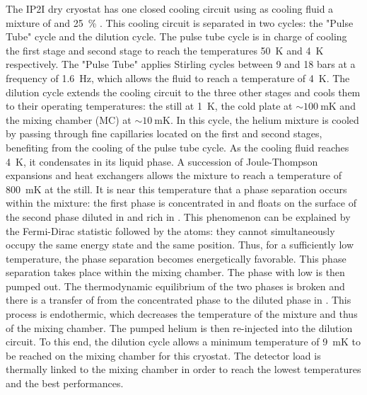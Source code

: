 The IP2I dry cryostat has one closed cooling circuit using as cooling fluid a mixture of  and \SI{25}{\percent} . This cooling circuit is separated in two cycles: the "Pulse Tube" cycle and the dilution cycle. 
The pulse tube cycle is in charge of cooling the first stage and second stage to reach the temperatures \SI{50}{\kelvin} and \SI{4}{\kelvin} respectively. The "Pulse Tube" applies Stirling cycles between 9 and 18 bars at a frequency of \SI{1.6}{\Hz}, which allows the  fluid to reach a temperature of \SI{4}{\kelvin}.
The dilution cycle extends the cooling circuit to the three other stages and cools them to their operating temperatures: the still at \SI{1}{\kelvin}, the cold plate at $\sim \SI{100}{\milli\kelvin}$ and the mixing chamber (MC) at $\sim \SI{10}{\milli\kelvin}$. In this cycle, the helium mixture is cooled by passing through fine capillaries located on the first and second stages, benefiting from the cooling of the pulse tube cycle. As the cooling fluid reaches \SI{4}{\kelvin}, it condensates in its liquid phase. A succession of Joule-Thompson expansions and heat exchangers allows the mixture to reach a temperature of \SI{800}{\milli\kelvin} at the still. It is near this temperature that a phase separation occurs within the mixture: the first phase is concentrated in  and floats on the surface of the second phase diluted in  and rich in . This phenomenon can be explained by the Fermi-Dirac statistic followed by the  atoms: they cannot simultaneously occupy the same energy state and the same position. Thus, for a sufficiently low temperature, the phase separation becomes energetically favorable. This phase separation takes place within the mixing chamber. The phase with low  is then pumped out. The thermodynamic equilibrium of the two phases is broken and there is a transfer of  from the concentrated phase to the diluted phase in . This process is endothermic, which decreases the temperature of the mixture and thus of the mixing chamber. The pumped helium  is then re-injected into the dilution circuit. To this end, the dilution cycle allows a minimum temperature of \SI{9}{\milli\kelvin} to be reached on the mixing chamber for this cryostat. The detector load is thermally linked to the mixing chamber in order to reach the lowest temperatures and the best performances.

